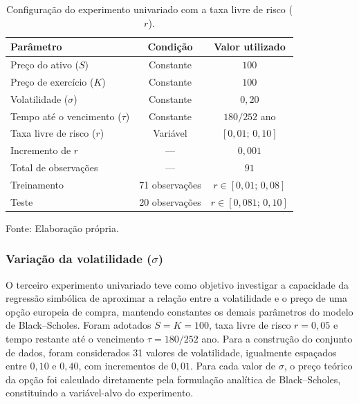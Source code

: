 \begin{table}[htbp]
    \centering
    \caption{Configuração do experimento univariado
    com a taxa livre de risco ($r$).}
    \label{tab:parametros_r}

    \begin{tabular}{lcc}
        \hline
        \textbf{Parâmetro} &
        \textbf{Condição} &
        \textbf{Valor utilizado} \\
        \hline
        Preço do ativo ($S$) & Constante & $100$ \\
        Preço de exercício ($K$) & Constante & $100$ \\
        Volatilidade ($\sigma$) & Constante & $0{,}20$ \\
        Tempo até o vencimento ($\tau$) &
        Constante & $180/252$ ano \\
        Taxa livre de risco ($r$) &
        Variável & $[0{,}01;\,0{,}10]$ \\
        Incremento de $r$ & --- & $0{,}001$ \\
        \hline
        Total de observações & --- & $91$ \\
        Treinamento & 71 observações &
        $r \in [0{,}01;\,0{,}08]$ \\
        Teste & 20 observações &
        $r \in [0{,}081;\,0{,}10]$ \\
        \hline
    \end{tabular}

    \vspace{0.2cm}
    {\footnotesize Fonte: Elaboração própria.\par}
\end{table}

\subsubsection*{Variação da volatilidade ($\sigma$)}
O terceiro experimento univariado teve como objetivo
investigar a capacidade da regressão simbólica de
aproximar a relação entre a volatilidade e o preço
de uma opção europeia de compra, mantendo constantes
os demais parâmetros do modelo de Black--Scholes. Foram adotados $S=K=100$, taxa livre de risco
$r=0{,}05$ e tempo restante até o vencimento
$\tau=180/252$ ano. Para a construção do conjunto de dados, foram
considerados 31 valores de volatilidade,
igualmente espaçados entre $0{,}10$ e $0{,}40$,
com incrementos de $0{,}01$. Para cada valor
de $\sigma$, o preço teórico da opção foi
calculado diretamente pela formulação analítica
de Black--Scholes, constituindo a variável-alvo
do experimento.

